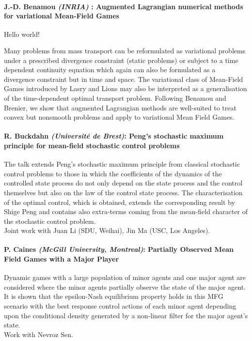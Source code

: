 \documentclass[11pt]{article}
\begin{document}
    \paragraph{ J.-D. Benamou {\sl(INRIA)} : Augmented Lagrangian numerical methods for variational Mean-Field Games}

Hello world!

Many problems from mass transport can be reformulated as 
variational problems under a prescribed divergence constraint (static 
problems) or subject to a time dependent continuity equation which again
 can also be formulated as a divergence constraint but in time and 
space. The variational class of Mean-Field Games introduced by Lasry and
 Lions may also be interpreted as a generalisation of the time-dependent
 optimal transport problem. Following Benamou and Brenier, we show that 
augmented Lagrangian methods are well-suited to treat convex but 
nonsmooth problems and apply to variational Mean Field Games.

\paragraph{R. Buckdahn {\sl(Universit{\'e}  de Brest)}:
  Peng's stochastic maximum principle for mean-field stochastic control problems }
The talk extends Peng's stochastic maximum principle from classical
 stochastic control problems to those in which the coefficients of the 
dynamics of the controlled state process do not only depend on the state
 process and the control themselves but also on the law of the control 
state process. The characterisation of the optimal control, which is 
obtained, extends the corresponding result by Shige Peng and contains 
also extra-terms coming from the mean-field character of the stochastic 
control problem.\\
Joint work with Juan Li (SDU, Weihai), Jin Ma (USC, Los Angeles).

\paragraph{P. Caines     {\sl (McGill University, Montreal)}:
   Partially Observed Mean Field Games with a Major  Player}
Dynamic games with a large population of minor agents and one major agent
are considered where the minor agents partially observe the state of the
major agent. It is shown that the epsilon-Nash equilibrium property holds
in this MFG scenario with the best response control actions of each minor
agent depending upon the conditional density generated by a non-linear
filter for the major agent's state.\\
Work with Nevroz Sen.
\end{document}
